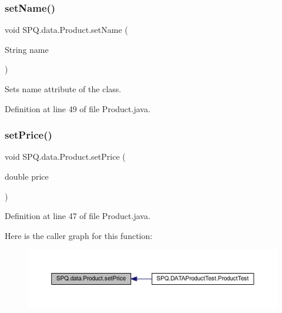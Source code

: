 \subsubsection{\texorpdfstring{set\+Name()}{setName()}\hspace{0.1cm}{\footnotesize\ttfamily [2/2]}}
{\footnotesize\ttfamily void S\+P\+Q.\+data.\+Product.\+set\+Name (\begin{DoxyParamCaption}\item[{String}]{name }\end{DoxyParamCaption})}

Sets name attribute of the class. 

Definition at line 49 of file Product.\+java.

\mbox{\label{class_s_p_q_1_1data_1_1_product_a6a12ed828fa7745b6bc8f5f2bc5dd014}} 
\subsubsection{\texorpdfstring{set\+Price()}{setPrice()}\hspace{0.1cm}{\footnotesize\ttfamily [1/2]}}
{\footnotesize\ttfamily void S\+P\+Q.\+data.\+Product.\+set\+Price (\begin{DoxyParamCaption}\item[{double}]{price }\end{DoxyParamCaption})}



Definition at line 47 of file Product.\+java.

Here is the caller graph for this function\+:\nopagebreak
\begin{figure}[H]
\begin{center}
\leavevmode
\includegraphics[width=350pt]{class_s_p_q_1_1data_1_1_product_a6a12ed828fa7745b6bc8f5f2bc5dd014_icgraph}
\end{center}
\end{figure}
\mbox{\label{class_s_p_q_1_1data_1_1_product_a6a12ed828fa7745b6bc8f5f2bc5dd014}} 
